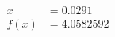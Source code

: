 \documentclass[preview]{standalone}
\begin{document}
\begin{align*}
x &= 0.0291\\f(x) &= 4.0582592
\end{align*}
\end{document}
